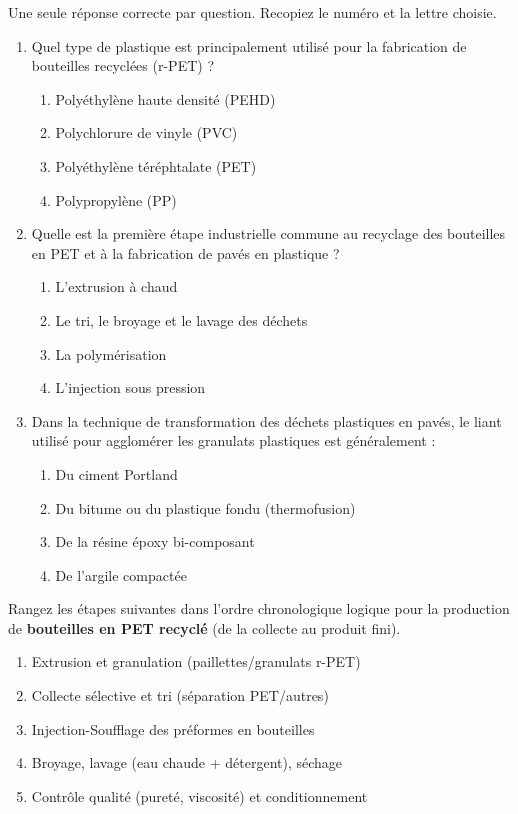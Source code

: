 \documentclass[11pt]{article}
\begin{document}
\begin{exercice}
Une seule réponse correcte par question. Recopiez le numéro et la lettre choisie.
\begin{enumerate}
    \item Quel type de plastique est principalement utilisé pour la fabrication de bouteilles recyclées (r-PET) ?
    \begin{enumerate}
        \item Polyéthylène haute densité (PEHD)
        \item Polychlorure de vinyle (PVC)
        \item Polyéthylène téréphtalate (PET)
        \item Polypropylène (PP)
    \end{enumerate}
    \item Quelle est la première étape industrielle commune au recyclage des bouteilles en PET et à la fabrication de pavés en plastique ?
    \begin{enumerate}
        \item L'extrusion à chaud
        \item Le tri, le broyage et le lavage des déchets
        \item La polymérisation
        \item L'injection sous pression
    \end{enumerate}
    \item Dans la technique de transformation des déchets plastiques en pavés, le liant utilisé pour agglomérer les granulats plastiques est généralement :
    \begin{enumerate}
        \item Du ciment Portland
        \item Du bitume ou du plastique fondu (thermofusion)
        \item De la résine époxy bi-composant
        \item De l'argile compactée
    \end{enumerate}
\end{enumerate}
\end{exercice}

\begin{exercice}
Rangez les étapes suivantes dans l'ordre chronologique logique pour la production de \textbf{bouteilles en PET recyclé} (de la collecte au produit fini).
\begin{enumerate}
    \item Extrusion et granulation (paillettes/granulats r-PET)
    \item Collecte sélective et tri (séparation PET/autres)
    \item Injection-Soufflage des préformes en bouteilles
    \item Broyage, lavage (eau chaude + détergent), séchage
    \item Contrôle qualité (pureté, viscosité) et conditionnement
\end{enumerate}
\end{exercice}
\end{document}
